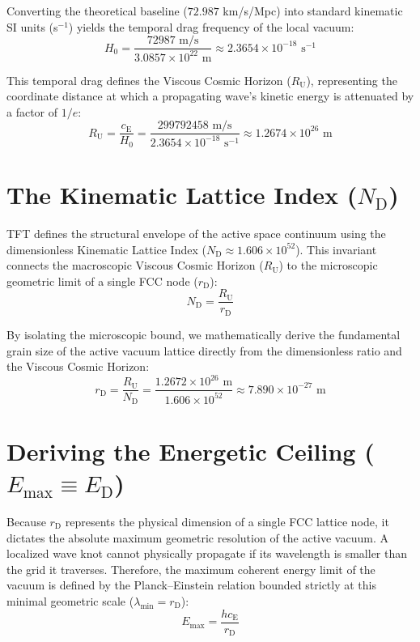 Converting the theoretical baseline ($72.987$ km/s/Mpc) into standard kinematic SI units (s$^{-1}$) yields the temporal drag frequency of the local vacuum:
\begin{equation}
    H_0 = \frac{72987 \text{ m/s}}{3.0857 \times 10^{22} \text{ m}} \approx 2.3654 \times 10^{-18} \text{ s}^{-1}
\end{equation}

This temporal drag defines the Viscous Cosmic Horizon ($R_{\mathrm{U}}$), representing the coordinate distance at which a propagating wave's kinetic energy is attenuated by a factor of $1/e$:
\begin{equation}
    R_{\mathrm{U}} = \frac{c_{\mathrm{E}}}{H_0} = \frac{299792458 \text{ m/s}}{2.3654 \times 10^{-18} \text{ s}^{-1}} \approx 1.2674 \times 10^{26} \text{ m}
\end{equation}

\section{The Kinematic Lattice Index ($N_{\mathrm{D}}$)}
TFT defines the structural envelope of the active space continuum using the dimensionless Kinematic Lattice Index ($N_{\mathrm{D}} \approx 1.606 \times 10^{52}$). This invariant connects the macroscopic Viscous Cosmic Horizon ($R_{\mathrm{U}}$) to the microscopic geometric limit of a single FCC node ($r_{\mathrm{D}}$):
\begin{equation}
    N_{\mathrm{D}} = \frac{R_{\mathrm{U}}}{r_{\mathrm{D}}}
\end{equation}

By isolating the microscopic bound, we mathematically derive the fundamental grain size of the active vacuum lattice directly from the dimensionless ratio and the Viscous Cosmic Horizon:
\begin{equation}
    r_{\mathrm{D}} = \frac{R_{\mathrm{U}}}{N_{\mathrm{D}}} = \frac{1.2672 \times 10^{26} \text{ m}}{1.606 \times 10^{52}} \approx 7.890 \times 10^{-27} \text{ m}
\end{equation}

\section{Deriving the Energetic Ceiling ($E_{\mathrm{max}} \equiv E_{\mathrm{D}}$)}
Because $r_{\mathrm{D}}$ represents the physical dimension of a single FCC lattice node, it dictates the absolute maximum geometric resolution of the active vacuum. A localized wave knot cannot physically propagate if its wavelength is smaller than the grid it traverses. Therefore, the maximum coherent energy limit of the vacuum is defined by the Planck--Einstein relation bounded strictly at this minimal geometric scale ($\lambda_{\mathrm{min}} = r_{\mathrm{D}}$):
\begin{equation}
    E_{\mathrm{max}} = \frac{h c_{\mathrm{E}}}{r_{\mathrm{D}}}
\end{equation}

